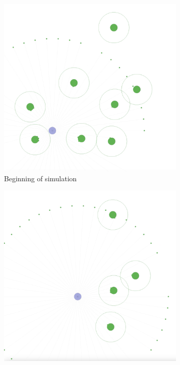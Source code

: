 \documentclass{scrartcl}
\begin{document}
\begin{figure}
  \centering
  \begin{subfigure}[b]{0.45\textwidth}
      \centering
      \includegraphics[width=\textwidth]{img/1_agent_1.png}
      \caption{Beginning of simulation}
      \label{fig:s_mer}
  \end{subfigure}
  \hfill
  \begin{subfigure}[b]{0.45\textwidth}
      \centering
      \includegraphics[width=\textwidth]{img/1_agent_2.png}

\end{subfigure}
\end{figure}
\end{document}
